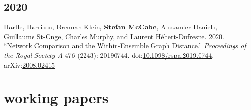 \documentclass[11pt, letter]{article}
\begin{document}
\subsection{2020}
\begin{hangparas}{.25in}{1}
  Hartle, Harrison, Brennan Klein, \textbf{Stefan McCabe}, Alexander Daniels, Guillaume St-Onge, Charles Murphy, and Laurent Hébert-Dufresne. 2020. ``Network Comparison and the Within-Ensemble Graph Distance.'' \textit{Proceedings of the Royal Society A} 476 (2243): 20190744. doi:\href{https://doi.org/10.1098/rspa.2019.0744}{10.1098/rspa.2019.0744}. arXiv:\href{https://arxiv.org/abs/2008.02415}{2008.02415} \vspace{2mm}
\end{hangparas}


\section{working papers}
\end{document}
